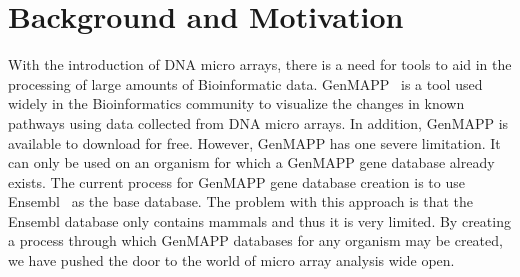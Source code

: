 \section{Background and Motivation}
With the introduction of DNA micro arrays, there is a need for tools
to aid in the processing of large amounts of Bioinformatic 
data.  GenMAPP~\cite{genmapp} is a tool used widely in the
Bioinformatics community to visualize the changes in known 
pathways using data collected from DNA micro arrays. In 
addition, GenMAPP is available to download for free. However,
GenMAPP has one severe limitation.  It can only be used on 
an organism for which a GenMAPP gene database already exists.  
The current process for GenMAPP gene database creation is to 
use Ensembl~\cite{ensembl} as the base database.  
The problem with this approach is that the Ensembl database 
only contains mammals and thus it is very limited.  
By creating a process through which GenMAPP databases for 
any organism may be created, we have pushed the door to 
the world of micro array analysis wide open. 


